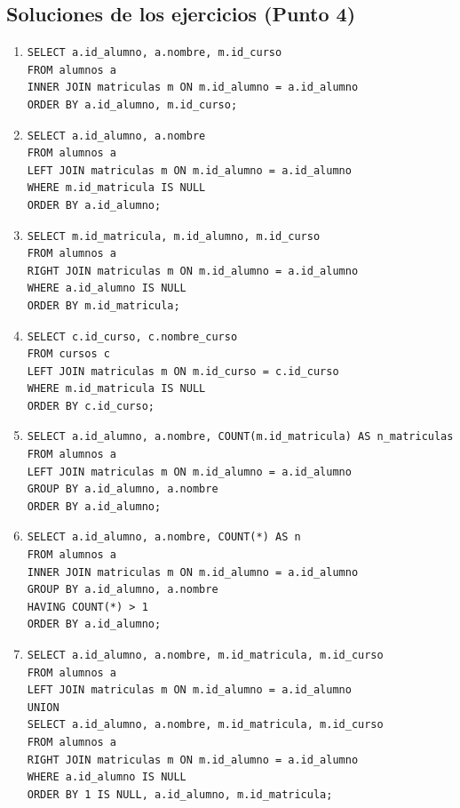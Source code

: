 \documentclass[11pt,a4paper]{article}
\begin{document}
\subsection*{Soluciones de los ejercicios (Punto 4)}
\begin{enumerate}[leftmargin=1.2em,label=\textbf{\arabic*.}]
\item
\begin{lstlisting}
SELECT a.id_alumno, a.nombre, m.id_curso
FROM alumnos a
INNER JOIN matriculas m ON m.id_alumno = a.id_alumno
ORDER BY a.id_alumno, m.id_curso;
\end{lstlisting}

\item
\begin{lstlisting}
SELECT a.id_alumno, a.nombre
FROM alumnos a
LEFT JOIN matriculas m ON m.id_alumno = a.id_alumno
WHERE m.id_matricula IS NULL
ORDER BY a.id_alumno;
\end{lstlisting}

\item
\begin{lstlisting}
SELECT m.id_matricula, m.id_alumno, m.id_curso
FROM alumnos a
RIGHT JOIN matriculas m ON m.id_alumno = a.id_alumno
WHERE a.id_alumno IS NULL
ORDER BY m.id_matricula;
\end{lstlisting}

\item
\begin{lstlisting}
SELECT c.id_curso, c.nombre_curso
FROM cursos c
LEFT JOIN matriculas m ON m.id_curso = c.id_curso
WHERE m.id_matricula IS NULL
ORDER BY c.id_curso;
\end{lstlisting}

\item
\begin{lstlisting}
SELECT a.id_alumno, a.nombre, COUNT(m.id_matricula) AS n_matriculas
FROM alumnos a
LEFT JOIN matriculas m ON m.id_alumno = a.id_alumno
GROUP BY a.id_alumno, a.nombre
ORDER BY a.id_alumno;
\end{lstlisting}

\item
\begin{lstlisting}
SELECT a.id_alumno, a.nombre, COUNT(*) AS n
FROM alumnos a
INNER JOIN matriculas m ON m.id_alumno = a.id_alumno
GROUP BY a.id_alumno, a.nombre
HAVING COUNT(*) > 1
ORDER BY a.id_alumno;
\end{lstlisting}

\item
\begin{lstlisting}
SELECT a.id_alumno, a.nombre, m.id_matricula, m.id_curso
FROM alumnos a
LEFT JOIN matriculas m ON m.id_alumno = a.id_alumno
UNION
SELECT a.id_alumno, a.nombre, m.id_matricula, m.id_curso
FROM alumnos a
RIGHT JOIN matriculas m ON m.id_alumno = a.id_alumno
WHERE a.id_alumno IS NULL
ORDER BY 1 IS NULL, a.id_alumno, m.id_matricula;
\end{lstlisting}


\end{enumerate}
\end{document}
